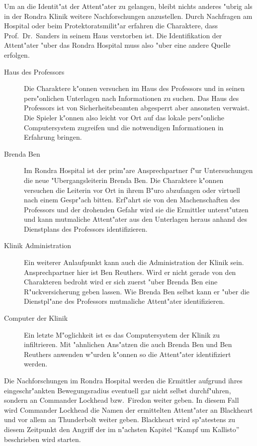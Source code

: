 
 Um an die Identit"at der Attent"ater zu gelangen, bleibt nichts anderes "ubrig als in der Rondra Klinik weitere Nachforschungen anzustellen. Durch Nachfragen am Hospital oder beim Protektoratsmilit"ar erfahren die Charaktere, dass Prof.~Dr.~Sanders in seinem Haus verstorben ist. Die Identifikation der Attent"ater "uber das Rondra Hospital muss also "uber eine andere Quelle erfolgen.

 \begin{description}
	\item [Haus des Professors] Die Charaktere k"onnen versuchen im Haus des Professors und in seinen pers"onlichen Unterlagen nach 
		Informationen zu suchen. Das Haus des Professors ist von Sicherheitsbeamten abgesperrt aber ansonsten verwaist. Die Spieler k"onnen also leicht vor Ort auf das lokale pers"onliche Computersystem zugreifen und die notwendigen Informationen in Erfahrung bringen.
	\item [Brenda Ben] Im Rondra Hospital ist der prim"are Ansprechpartner f"ur Untersuchungen die neue "Ubergangsleiterin Brenda Ben. 
		Die Charaktere k"onnen versuchen die Leiterin vor Ort in ihrem B"uro abzufangen oder virtuell nach einem Gespr"ach bitten. Erf"ahrt sie von den Machenschaften des Professors und der drohenden Gefahr wird sie die Ermittler unterst"utzen und kann mutma\3liche Attent"ater aus den Unterlagen heraus anhand des Dienstplans des Professors identifizieren.
	\item [Klinik Administration] Ein weiterer Anlaufpunkt kann auch die Administration der Klinik sein. Ansprechpartner hier ist Ben 
		Reuthers. Wird er nicht gerade von den Charakteren bedroht wird er sich zuerst "uber Brenda Ben eine R"uckversicherung geben lassen. Wie Brenda Ben selbst kann er "uber die Dienstpl"ane des Professors mutma\3liche Attent"ater identifizieren.
	\item [Computer der Klinik] Ein letzte M"oglichkeit ist es das Computersystem der Klinik zu infiltrieren. Mit "ahnlichen Ans"atzen 
		die auch Brenda Ben und Ben Reuthers anwenden w"urden k"onnen so die Attent"ater identifiziert werden.
 \end{description}

 Die Nachforschungen im Rondra Hospital werden die Ermittler aufgrund ihres eingeschr"ankten Bewegungsradius eventuell gar nicht selbst durchf"uhren, sondern an Commander Lockhead bzw.~Firedon weiter geben. In diesem Fall wird Commander Lockhead die Namen der ermittelten Attent"ater an Blackheart und vor allem an Thunderbolt weiter geben. Blackheart wird sp"atestens zu diesem Zeitpunkt den Angriff der im n"achsten Kapitel "`Kampf um Kallisto"' beschrieben wird starten.
